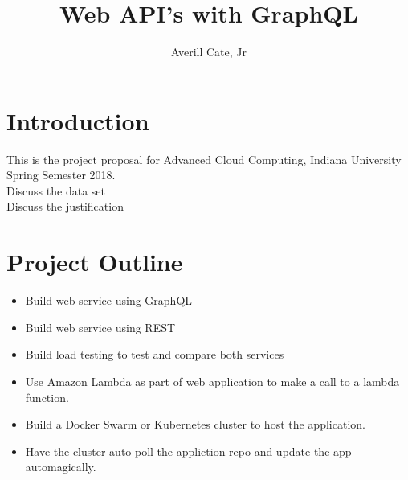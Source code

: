\documentclass{article}
\title{Web API's with GraphQL}
\author{Averill Cate, Jr}
\begin{document}
\maketitle

\section{Introduction}
This is the project proposal for Advanced Cloud Computing, Indiana University 
Spring Semester 2018.
\\
Discuss the data set\\
Discuss the justification\\

\section{Project Outline}
\begin{itemize}
\item Build web service using GraphQL
\item Build web service using REST
\item Build load testing to test and compare both services
\item Use Amazon Lambda as part of web application to make a call to a lambda function.
\item Build a Docker Swarm or Kubernetes cluster to host the application.
\item Have the cluster auto-poll the appliction repo and update the app automagically.
\end{itemize}
\end{document}
